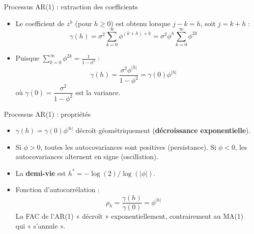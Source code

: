\documentclass[11pt,aspectratio=169]{beamer}
\begin{document}
\begin{frame}{Processus AR(1) : extraction des coefficients}

\begin{itemize}

\item Le coefficient de $z^h$ (pour $h \geq 0$) est obtenu lorsque $j - k = h$, soit $j = k + h$ :
  \[
  \gamma(h) = \sigma^2 \sum_{k=0}^{\infty} \phi^{(k+h)+k} = \sigma^2 \phi^h \sum_{k=0}^{\infty} \phi^{2k}
  \]\newline

\item Puisque $\sum_{k=0}^{\infty} \phi^{2k} = \frac{1}{1-\phi^2}$ :
  \[
  \gamma(h) = \frac{\sigma^2 \phi^{|h|}}{1 - \phi^2} = \gamma(0) \phi^{|h|}
  \]
  où $\gamma(0) = \dfrac{\sigma^2}{1 - \phi^2}$ est la variance.

\end{itemize}

\end{frame}

\begin{frame}{Processus AR(1) : propriétés}

\begin{itemize}

\item $\gamma(h) = \gamma(0) \phi^{|h|}$ décroît géométriquement (\textbf{décroissance exponentielle}).\newline

\item Si $\phi > 0$, toutes les autocovariances sont positives (persistance). Si $\phi < 0$, les autocovariances alternent en signe (oscillation).\newline

\item La \textbf{demi-vie} est $h^* = -\log(2)/\log(|\phi|)$.\newline

\item Fonction d'autocorrélation :
  \[
  \rho_h = \frac{\gamma(h)}{\gamma(0)} = \phi^{|h|}
  \]
  La FAC de l'AR(1) « décroît » exponentiellement, contrairement au MA(1) qui « s'annule ».

\end{itemize}

\end{frame}
\end{document}

